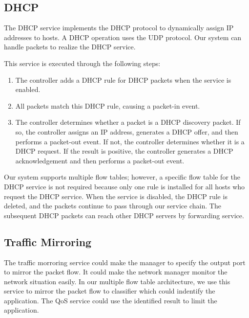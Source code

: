 \documentclass[conference]{IEEEtran}
\begin{document}
\subsection{DHCP}
The DHCP service implements the DHCP protocol to dynamically assign IP addresses to hosts.
A DHCP operation uses the UDP protocol.
Our system can handle packets to realize the DHCP service.

This service is executed through the following steps:
\begin{enumerate}
\item The controller adds a DHCP rule for DHCP packets when the service is enabled.
\item All packets match this DHCP rule, causing a packet-in event.
\item The controller determines whether a packet is a DHCP discovery packet. If so, the controller assigns an IP address, generates a DHCP offer, and then performs a packet-out event. If not, the controller determines whether it is a DHCP request. If the result is positive, the controller generates a DHCP acknowledgement and then performs a packet-out event.
\end{enumerate}

Our system supports multiple flow tables; however, a specific flow table for the DHCP service is not required because only one rule is installed for all hosts who request the DHCP service.
When the service is disabled, the DHCP rule is deleted, and the packets continue to pass through our service chain.
The subsequent DHCP packets can reach other DHCP servers by forwarding service.


\subsection{Traffic Mirroring} \label{ssec:mirror}
The traffic morroring service could make the manager to specify the output port to mirror the packet flow.
It could make the network manager monitor the network situation easily.
In our multiple flow table architecture, we use this service to mirror the packet flow to classifier which could indentify the application.
The QoS service could use the identified result to limit the application.
\end{document}
